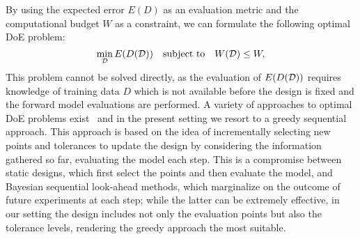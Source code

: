 By using the expected error $E(D)$ as an evaluation metric and the computational budget $W$ as a constraint, we can formulate the following optimal DoE problem:
\begin{equation} \label{prob:doe}
    \min_{\mathcal D} E(D(\mathcal D)) \quad \text{subject to} \quad W(\mathcal D) \le W,
\end{equation}
This problem cannot be solved directly, as the evaluation of $E(D(\mathcal D))$ requires knowledge of training data $D$ which is not available before the design is fixed and the forward model evaluations are performed.
A variety of approaches to optimal DoE problems exist~\cite{HuanJagalurMarzouk2024} and in the present setting we resort to a greedy sequential approach. 
This approach is based on the idea of incrementally selecting new points and tolerances to update the design by considering the information gathered so far, evaluating the model each step. \newline
This is a compromise between static designs, which first select the points and then evaluate the model, and Bayesian sequential look-ahead methods, which marginalize on the outcome of future experiments at each step; while the latter can be extremely effective, in our setting the design includes not only the evaluation points but also the tolerance levels, rendering the greedy approach the most suitable. \medbreak

